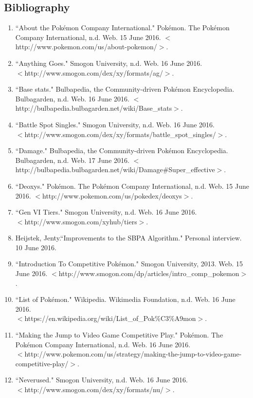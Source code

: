 \documentclass{article}
\begin{document}
\subsection{Bibliography}
\begin{enumerate}
	\item ``About the Pokémon Company International." Pok\'emon. The Pok\'emon Company International, n.d. Web. 15 June 2016. $<$http://www.pokemon.com/us/about-pokemon/$>$.
	\item ``Anything Goes." Smogon University, n.d. Web. 16 June 2016. \\$<$http://www.smogon.com/dex/xy/formats/ag/$>$. 
	\item ``Base stats." Bulbapedia, the Community-driven Pokémon Encyclopedia. Bulbagarden, n.d. Web. 16 June 2016. $<$http://bulbapedia.bulbagarden.net/wiki/Base\_stats$>$.
	\item ``Battle Spot Singles." Smogon University, n.d. Web. 16 June 2016. \\$<$http://www.smogon.com/dex/xy/formats/battle\_spot\_singles/$>$.
	\item ``Damage." Bulbapedia, the Community-driven Pokémon Encyclopedia. Bulbagarden, n.d. Web. 17 June 2016. $<$http://bulbapedia.bulbagarden.net/wiki/Damage\#Super\_effective$>$.
	\item ``Deoxys." Pok\'emon. The Pok\'emon Company International, n.d. Web. 15 June 2016. $<$http://www.pokemon.com/us/pokedex/deoxys$>$. 
	\item ``Gen VI Tiers." Smogon University, n.d. Web. 16 June 2016. \\$<$http://www.smogon.com/xyhub/tiers$>$. 
	\item  Heijstek, Jenty.``Improvements to the SBPA Algorithm." Personal interview. 10 June 2016.  
	\item``Introduction To Competitive Pok\'emon." Smogon University, 2013. Web. 15 June 2016. $<$http://www.smogon.com/dp/articles/intro\_comp\_pokemon$>$.
	\item ``List of Pokémon." Wikipedia. Wikimedia Foundation, n.d. Web. 16 June 2016. \\$<$https://en.wikipedia.org/wiki/List\_of\_Pok\%C3\%A9mon$>$.
	\item ``Making the Jump to Video Game Competitive Play." Pok\'emon. The Pok\'emon Company International, n.d. Web. 16 June 2016. \\$<$http://www.pokemon.com/us/strategy/making-the-jump-to-video-game-competitive-play/$>$.  
	\item ``Neverused." Smogon University, n.d. Web. 16 June 2016. \\$<$http://www.smogon.com/dex/xy/formats/nu/$>$.

\end{enumerate}
\end{document}
